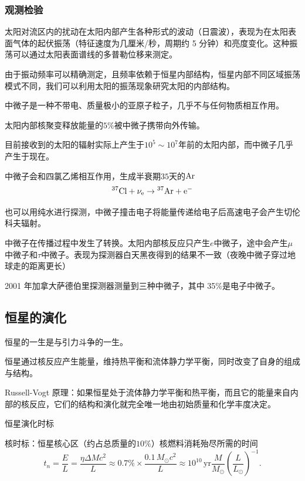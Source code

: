 \documentclass[../天体物理基础.tex]{subfiles}
\begin{document}
\subsubsection{观测检验}
太阳对流区内的扰动在太阳内部产生各种形式的波动（日震波），表现为在太阳表面气体的起伏振荡（特征速度为几厘米/秒，周期约 5 分钟）和亮度变化。这种振荡可以通过太阳表面谱线的多普勒位移来测定。

由于振动频率可以精确测定，且频率依赖于恒星内部结构，恒星内部不同区域振荡模式不同，我们可以利用太阳的振荡现象研究太阳的内部结构。

中微子是一种不带电、质量极小的亚原子粒子，几乎不与任何物质相互作用。

太阳内部核聚变释放能量的$5\%$被中微子携带向外传输。

目前接收到的太阳的辐射实际上产生于$10^{5}\sim10^{7}$年前的太阳内部，而中微子几乎产生于现在。

中微子会和四氯乙烯相互作用，生成半衰期$35$天的$\rm Ar$
\begin{equation}
\rm ^{37}Cl+\nu_e\to{}^{37}Ar+e^-\\
\end{equation}

也可以用纯水进行探测，中微子撞击电子将能量传递给电子后高速电子会产生切伦科夫辐射。

中微子在传播过程中发生了转换。太阳内部核反应只产生$e$中微子，途中会产生$\mu$中微子和$\tau$中微子。表现为探测器白天黑夜得到的结果不一致（夜晚中微子穿过地球走的距离更长）

2001 年加拿大萨德伯里探测器测量到三种中微子，其中 35\%是电子中微子。

\subsection{恒星的演化}
恒星的一生是与引力斗争的一生。

恒星通过核反应产生能量，维持热平衡和流体静力学平衡，同时改变了自身的组成与结构。

Russell-Vogt 原理：如果恒星处于流体静力学平衡和热平衡，而且它的能量来自内部的核反应，它们的结构和演化就完全唯一地由初始质量和化学丰度决定。

恒星演化时标

核时标：恒星核心区（约占总质量的$10\%$）核燃料消耗殆尽所需的时间
\begin{equation}
t_{n}=\frac{E}{L}=\frac{\eta\Delta{}Mc^{2}}{L}\approx0.7\%\times\frac{0.1\,M_{\odot}c^{2}}{L}\approx10^{10}\,\mathrm{yr}\frac{M}{M_{\odot}}\left(\frac{L}{L_{\odot}}\right)^{-1}.
\end{equation}
\end{document}
